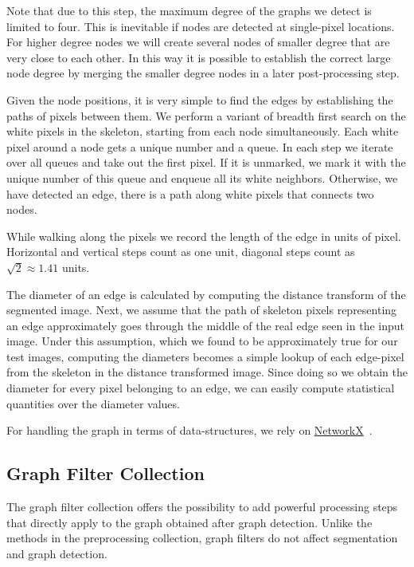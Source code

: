 		Note that due to this step, the maximum degree of the graphs we detect is limited to four. This is inevitable if nodes are detected at single-pixel locations. For higher degree nodes we will create several nodes of smaller degree that are very close to each other. In this way it is possible to establish the correct large node degree by merging the smaller degree nodes in a later post-processing step.

		Given the node positions, it is very simple to find the edges by establishing the paths of pixels between them. We perform a variant of breadth first search on the white pixels in the skeleton, starting from each node simultaneously. Each white pixel around a node gets a unique number and a queue. In each step we iterate over all queues and take out the first pixel. If it is unmarked, we mark it with the unique number of this queue and enqueue all its white neighbors. Otherwise, we have detected an edge, \ie there is a path along white pixels that connects two nodes.

		While walking along the pixels we record the length of the edge in units of pixel. Horizontal and vertical steps count as one unit, diagonal steps count as $\sqrt 2\approx 1.41$ units.

		The diameter of an edge is calculated by computing the distance transform of the segmented image. Next, we assume that the path of skeleton pixels representing an edge approximately goes through the middle of the real edge seen in the input image. Under this assumption, which we found to be approximately true for our test images, computing the diameters becomes a simple lookup of each edge-pixel from the skeleton in the distance transformed image. Since doing so we obtain the diameter for every pixel belonging to an edge, we can easily compute statistical quantities over the diameter values.

		For handling the graph in terms of data-structures, we rely on \href{https://networkx.github.io/documentation/latest/index.html}{NetworkX}~\cite{networkx}.

	\subsection{Graph Filter Collection}

		The graph filter collection offers the possibility to add powerful processing steps that directly apply to the graph obtained after graph detection. Unlike the methods in the preprocessing collection, graph filters do not affect segmentation and graph detection.

